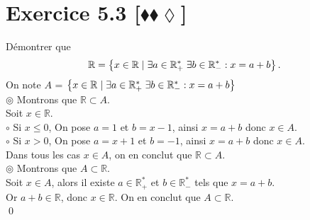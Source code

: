 \documentclass[10pt]{article}
\begin{document}
\section*{Exercice 5.3 [$\blacklozenge\blacklozenge\lozenge$]}
\begin{tcolorbox}[enhanced, width=7in, center, size=fbox, fontupper=\large, drop shadow southwest]
    Démontrer que
    \begin{equation*}
        \mathbb{R} = \left\lbrace{x \in \mathbb{R} \hspace{0.1cm} | \hspace{0.1cm} \exists a \in \mathbb{R}^*_+ \hspace{0.1cm} \exists b \in \mathbb{R}^*_- : x = a + b}\right\rbrace.
    \end{equation*}
    On note $A$ = $\left\lbrace{x \in \mathbb{R} \hspace{0.1cm} | \hspace{0.1cm} \exists a \in \mathbb{R}^*_+ \hspace{0.1cm} \exists b \in \mathbb{R}^*_- : x = a + b}\right\rbrace$\\
    $\circledcirc$ Montrons que $\mathbb{R} \subset A$.\\
    Soit $x \in \mathbb{R}$.\\
    $\circ$ Si $x \leq 0$, On pose $a=1$ et $b=x-1$, ainsi $x = a + b$ donc $x \in A$.\\
    $\circ$ Si $x > 0$, On pose $a=x+1$ et $b=-1$, ainsi $x = a + b$ donc $x \in A$.\\
    Dans tous les cas $x \in A$, on en conclut que $\mathbb{R} \subset A$.\\
    $\circledcirc$ Montrons que $A \subset \mathbb{R}$.\\
    Soit $x \in A$, alors il existe $a \in \mathbb{R}^*_+$ et $b \in \mathbb{R}^*_-$ tels que $x = a + b$.\\
    Or $a + b \in \mathbb{R}$, donc $x \in \mathbb{R}$. On en conclut que $A \subset \mathbb{R}$.\\
    \qed 
\end{tcolorbox}

\end{document}
